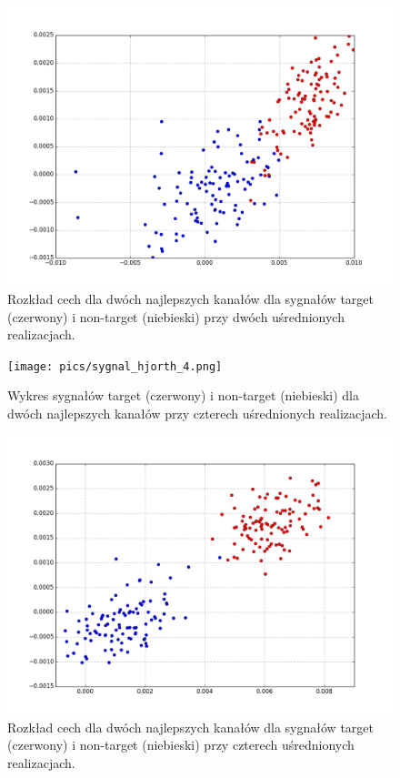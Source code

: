 \documentclass[licencjacka,openright]{pracamgr}
\begin{document}
\begin{figure}[H]
\centering
\includegraphics[scale=0.55, trim=0mm 0mm 0mm 0mm, clip=True]{pics/cecha_hjorth_2.png}
\caption{Rozkład cech dla dwóch najlepszych kanałów dla sygnałów target (czerwony) i non-target (niebieski) przy dwóch uśrednionych realizacjach.}
\label{cecha_hjorth_2}
\end{figure}

\begin{figure}[H]
\centering
\texttt{[image: pics/sygnal\_hjorth\_4.png]}
\caption{Wykres sygnałów target (czerwony) i non-target (niebieski) dla dwóch najlepszych kanałów przy czterech uśrednionych realizacjach.}
\label{sygnal_hjorth_4}
\end{figure}

\begin{figure}[H]
\centering
\includegraphics[scale=0.55, trim=0mm 0mm 0mm 0mm, clip=True]{pics/cecha_hjorth_4.png}
\caption{Rozkład cech dla dwóch najlepszych kanałów dla sygnałów target (czerwony) i non-target (niebieski) przy czterech uśrednionych realizacjach.}
\label{cecha_hjorth_4}
\end{figure}
\end{document}
